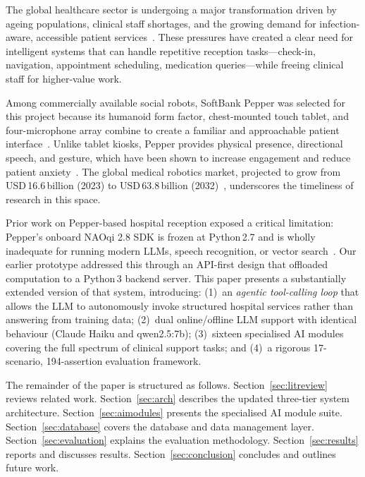 \documentclass[conference]{IEEEtran}
\begin{document}
The global healthcare sector is undergoing a major transformation driven by
ageing populations, clinical staff shortages, and the growing demand for
infection-aware, accessible patient services~\cite{holland2021}.
These pressures have created a clear need for intelligent systems that can handle
repetitive reception tasks—check-in, navigation, appointment scheduling,
medication queries—while freeing clinical staff for higher-value work.

Among commercially available social robots, SoftBank Pepper was selected for this
project because its humanoid form factor, chest-mounted touch tablet, and
four-microphone array combine to create a familiar and approachable patient
interface~\cite{blindheim2023}.
Unlike tablet kiosks, Pepper provides physical presence, directional speech, and
gesture, which have been shown to increase engagement and reduce patient
anxiety~\cite{rostosinskaja2025}.
The global medical robotics market, projected to grow from
USD\,16.6\,billion (2023) to USD\,63.8\,billion (2032)~\cite{kushniruk2025},
underscores the timeliness of research in this space.

Prior work on Pepper-based hospital reception exposed a critical limitation:
Pepper's onboard NAOqi 2.8 SDK is frozen at Python\,2.7 and is wholly inadequate
for running modern LLMs, speech recognition, or vector search~\cite{gard2018}.
Our earlier prototype addressed this through an API-first design that offloaded
computation to a Python\,3 backend server.
This paper presents a substantially extended version of that system, introducing:
(1)~an \emph{agentic tool-calling loop} that allows the LLM to autonomously
invoke structured hospital services rather than answering from training data;
(2)~dual online/offline LLM support with identical behaviour (Claude Haiku and
qwen2.5:7b);
(3)~sixteen specialised AI modules covering the full spectrum of clinical support
tasks; and
(4)~a rigorous 17-scenario, 194-assertion evaluation framework.

The remainder of the paper is structured as follows.
Section~\ref{sec:litreview} reviews related work.
Section~\ref{sec:arch} describes the updated three-tier system architecture.
Section~\ref{sec:aimodules} presents the specialised AI module suite.
Section~\ref{sec:database} covers the database and data management layer.
Section~\ref{sec:evaluation} explains the evaluation methodology.
Section~\ref{sec:results} reports and discusses results.
Section~\ref{sec:conclusion} concludes and outlines future work.
\end{document}
